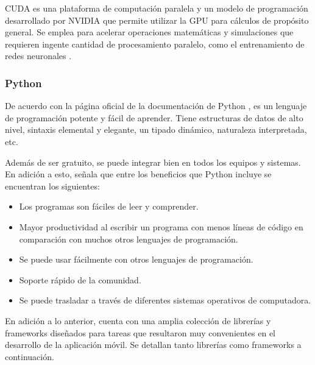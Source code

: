 CUDA es una plataforma de computación paralela y un modelo de programación desarrollado por NVIDIA que permite utilizar la GPU para cálculos de propósito general. Se emplea para acelerar operaciones matemáticas y simulaciones que requieren ingente cantidad de procesamiento paralelo, como el entrenamiento de redes neuronales \cite{cuda}.

\subsubsection{Python}

De acuerdo con la página oficial de la documentación de Python \cite{pythonTutorial}, es un lenguaje de programación potente y fácil de aprender. Tiene estructuras de datos de alto nivel, sintaxis elemental y elegante, un tipado dinámico, naturaleza interpretada, etc. 

Además de ser gratuito, se puede integrar bien en todos los equipos y sistemas. En adición a esto, \cite{awsPython} señala que entre los beneficios que Python incluye se encuentran los siguientes:

\begin{itemize}
	
	\item Los programas son fáciles de leer y comprender.
	
	\item Mayor productividad al escribir un programa con menos líneas de código en comparación con muchos otros lenguajes de programación.
	
	\item Se puede usar fácilmente con otros lenguajes de programación.
	
	\item Soporte rápido de la comunidad.
	
	\item Se puede trasladar a través de diferentes sistemas operativos de computadora.
	
\end{itemize}

En adición a lo anterior, cuenta con una amplia colección de librerías y frameworks diseñados para tareas que resultaron muy convenientes en el desarrollo de la aplicación móvil. Se detallan tanto librerías como frameworks a continuación.

